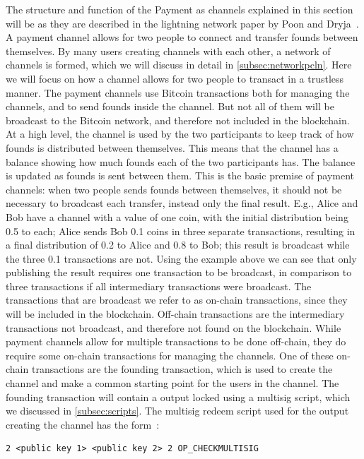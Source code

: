 The structure and function of the Payment as channels explained in this section will be as they are described in the lightning network paper by Poon and Dryja~\cite{poon2015bitcoin}. A payment channel allows for two people to connect and transfer founds between themselves. By many users creating channels with each other, a network of channels is formed, which we will discuss in detail in \cref{subsec:networkpcln}. Here we will focus on how a channel allows for two people to transact in a trustless manner. The payment channels use Bitcoin transactions both for managing the channels, and to send founds inside the channel. But not all of them will be broadcast to the Bitcoin network, and therefore not included in the blockchain. At a high level, the channel is used by the two participants to keep track of how founds is distributed between themselves. This means that the channel has a balance showing how much founds each of the two participants has. The balance is updated as founds is sent between them. This is the basic premise of payment channels: when two people sends founds between themselves, it should not be necessary to broadcast each transfer, instead only the final result. E.g., Alice and Bob have a channel with a value of one coin, with the initial distribution being 0.5 to each; Alice sends Bob 0.1 coins in three separate transactions, resulting in a final distribution of 0.2 to Alice and 0.8 to Bob; this result is broadcast while the three 0.1 transactions are not. 
Using the example above we can see that only publishing the result requires one transaction to be broadcast, in comparison to three transactions if all intermediary transactions were broadcast.
The transactions that are broadcast we refer to as on-chain transactions, since they will be included in the blockchain. Off-chain transactions are the intermediary transactions not broadcast, and therefore not found on the blockchain.
While payment channels allow for multiple transactions to be done off-chain, they do require some on-chain transactions for managing the channels. One of these on-chain transactions are the founding transaction, which is used to create the channel and make a common starting point for the users in the channel. The founding transaction will contain a output locked using a multisig script, which we discussed in \cref{subsec:scripts}. The multisig redeem script used for the output creating the channel has the form~\cite{bolt3}:

\begin{verbatim}
2 <public key 1> <public key 2> 2 OP_CHECKMULTISIG
\end{verbatim}


